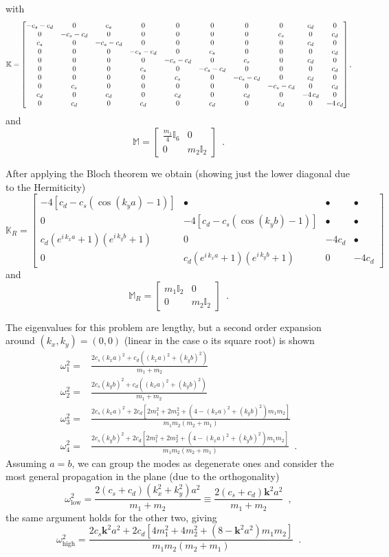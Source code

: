 \documentclass[12pt,letterpaper]{article}
\begin{document}
with
\[\mathbb{K} =\begin{bmatrix}
-{c}_{s}-{c}_{d} & 0 & {c}_{s} & 0 & 0 & 0 & 0 & 0 & {c}_{d} & 0\cr
 0 & -{c}_{s}-{c}_{d} & 0 & 0 & 0 & 0 & 0 & {c}_{s} & 0 & {c}_{d}\cr
 {c}_{s} & 0 & -{c}_{s}-{c}_{d} & 0 & 0 & 0 & 0 & 0 & {c}_{d} & 0\cr
 0 & 0 & 0 & -{c}_{s}-{c}_{d} & 0 & {c}_{s} & 0 & 0 & 0 & {c}_{d}\cr
 0 & 0 & 0 & 0 & -{c}_{s}-{c}_{d} & 0 & {c}_{s} & 0 & {c}_{d} & 0\cr
 0 & 0 & 0 & {c}_{s} & 0 & -{c}_{s}-{c}_{d} & 0 & 0 & 0 & {c}_{d}\cr
 0 & 0 & 0 & 0 & {c}_{s} & 0 & -{c}_{s}-{c}_{d} & 0 & {c}_{d} & 0\cr
 0 & {c}_{s} & 0 & 0 & 0 & 0 & 0 & -{c}_{s}-{c}_{d} & 0 & {c}_{d}\cr
 {c}_{d} & 0 & {c}_{d} & 0 & {c}_{d} & 0 & {c}_{d} & 0 & -4\,{c}_{d} & 0\cr
 0 & {c}_{d} & 0 & {c}_{d} & 0 & {c}_{d} & 0 & {c}_{d} & 0 & -4\,{c}_{d}\end{bmatrix},\]
and
\[\mathbb{M} = \begin{bmatrix}
\frac{m_1}{4}\mathbb{I}_6 & 0 \\ 
0 & m_2\mathbb{I}_2
\end{bmatrix} \enspace . \]

After applying the Bloch theorem we obtain (showing just the lower diagonal due to the Hermiticity)
\[\mathbb{K}_R = \begin{bmatrix}
-4\left[c_d - c_s(\cos(k_y a) - 1)\right]  & \bullet & \bullet & \bullet\\
 0 & -4\left[c_d - c_s(\cos(k_y b) - 1)\right]  & \bullet & \bullet\\
 c_d\left( e^{i\, k_x a}+1\right) \left( e^{i\, k_y b}+1\right)  & 0 & -4c_d & \bullet\\
 0 & c_d\left( e^{i\, k_x a}+1\right) \left( e^{i\, k_y b}+1\right)  & 0 & -4c_d
\end{bmatrix}\]
and
\[\mathbb{M}_R =\begin{bmatrix}
m_1\mathbb{I}_2 & 0 \\ 
0 & m_2\mathbb{I}_2
\end{bmatrix} \enspace .\]

The eigenvalues for this problem are lengthy, but a second order expansion around $(k_x,k_y)=(0,0)$ (linear in the case o its square root) is shown
\begin{align*}
\omega_1^2 =& \frac{2c_s (k_x a)^2 + c_d\left((k_x a)^2 + (k_y b)^2\right)}{m_1 + m_2}\\
\omega_2^2 =& \frac{2c_s (k_y b)^2 + c_d\left((k_x a)^2 + (k_y b)^2\right)}{m_1 + m_2}\\
\omega_3^2 =& \frac{2c_s (k_x a)^2 + 2c_d\left[2m_1^2 + 2m_2^2 + \left(4 - (k_x a)^2 +(k_y b)^2\right)m_1 m_2\right] } {m_1 m_2 (m_2 + m_1)}\\
\omega_4^2 =& \frac{2c_s (k_y b)^2 + 2c_d\left[2m_1^2 + 2m_2^2 + \left(4 - (k_x a)^2 +(k_y b)^2\right)m_1 m_2\right] } {m_1 m_2 (m_2 + m_1)} \enspace .
\end{align*}
Assuming $a=b$, we can group the modes as degenerate ones and consider the most general propagation in the plane (due to the orthogonality)
\[\omega_{\text{low}}^2 = \frac{2 (c_s + c_d) (k_x^2 + k_y^2)a^2}{m_1 + m_2} \equiv \frac{2 (c_s + c_d) \mathbf{k}^2 a^2}{m_1 + m_2} \enspace ,\]
the same argument holds for the other two, giving
\[\omega_{\text{high}}^2 = \frac{2c_s \mathbf{k}^2a^2 + 2c_d\left[4m_1^2 + 4m_2^2 + \left(8 - \mathbf{k}^2 a^2\right)m_1 m_2\right] } {m_1 m_2 (m_2 + m_1)} \enspace .\]
\end{document}
